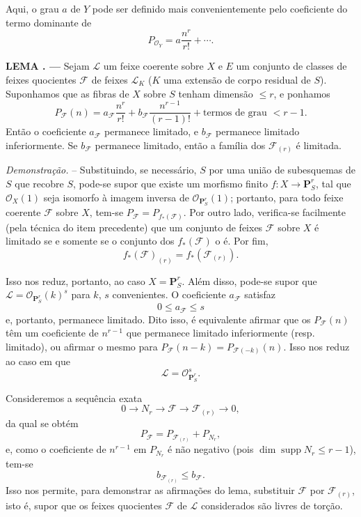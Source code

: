 \documentclass[11pt,twoside,openany]{book}
\numberwithin{equation}{section}
\newcommand{\src}[1]{%
  \phantomsection\hypertarget{src:#1}{}%
  \marginpar{\raggedleft\footnotesize\sffamily #1}%
}
\theoremstyle{plain}
\theoremstyle{definition}
\theoremstyle{remark}
\newcommand{\result}[2]{%
  \par\medskip\noindent\textbf{#1%
  \if\relax\detokenize{#2}\relax\else\space#2\fi. ---}\enspace
}
\newcommand{\FgaUnitKey}{frontmatter}
\renewcommand{\src}[1]{%
  \phantomsection\hypertarget{src:\FgaUnitKey:#1}{}%
  \marginpar{\raggedleft\footnotesize\sffamily #1}%
}
\begin{document}
Aqui, o grau $a$ de $Y$ pode ser definido mais convenientemente pelo
coeficiente do termo dominante de
\[
P_{\mathcal O_Y}=a\frac{n^r}{r!}+\cdots.
\]

\result{LEMA}{2.5} Sejam $\mathcal L$ um feixe coerente sobre $X$ e $E$ um
conjunto de classes de feixes quocientes $\mathcal F$ de feixes $\mathcal L_K$
($K$ uma extensão de corpo residual de $S$). Suponhamos que as fibras de $X$
sobre $S$ tenham dimensão $\leq r$, e ponhamos
\[
P_{\mathcal F}(n)=a_{\mathcal F}\frac{n^r}{r!}
+b_{\mathcal F}\frac{n^{r-1}}{(r-1)!}
+\text{termos de grau $<r-1$}.
\]
Então o coeficiente $a_{\mathcal F}$ permanece limitado, e $b_{\mathcal F}$
permanece limitado inferiormente. Se $b_{\mathcal F}$ permanece limitado,
então a família dos $\mathcal F_{(r)}$ é limitada.

\emph{Demonstração.} -- Substituindo, se necessário, $S$ por uma união de
subesquemas de $S$ que recobre $S$, pode-se supor que existe um morfismo finito
$f:X\longrightarrow\mathbf P^r_S$, tal que $\mathcal O_X(1)$ seja isomorfo à
imagem inversa de $\mathcal O_{\mathbf P^r_S}(1)$; portanto, para todo feixe
coerente $\mathcal F$ sobre $X$, tem-se
$P_{\mathcal F}=P_{f_*(\mathcal F)}$. Por outro lado, verifica-se facilmente
(pela técnica do item precedente) que um conjunto de feixes $\mathcal F$ sobre
$X$ é limitado se e somente se o conjunto dos $f_*(\mathcal F)$ o é. Por fim,
\[
f_*(\mathcal F)_{(r)}=f_*(\mathcal F_{(r)}).
\]
\src{256}
Isso nos reduz, portanto, ao caso $X=\mathbf P^r_S$. Além disso, pode-se supor
que $\mathcal L=\mathcal O_{\mathbf P^r_S}(k)^s$ para $k$, $s$ convenientes. O
coeficiente $a_{\mathcal F}$ satisfaz
\[
0\leq a_{\mathcal F}\leq s
\]
e, portanto, permanece limitado. Dito isso, é equivalente afirmar que os
$P_{\mathcal F}(n)$ têm um coeficiente de $n^{r-1}$ que permanece limitado
inferiormente (resp. limitado), ou afirmar o mesmo para
$P_{\mathcal F}(n-k)=P_{\mathcal F(-k)}(n)$. Isso nos reduz ao caso em que
\[
\mathcal L=\mathcal O_{\mathbf P^r_S}^{s}.
\]

Consideremos a sequência exata
\[
0\longrightarrow N_r\longrightarrow\mathcal F
\longrightarrow\mathcal F_{(r)}\longrightarrow0,
\]
da qual se obtém
\[
P_{\mathcal F}=P_{\mathcal F_{(r)}}+P_{N_r},
\]
e, como o coeficiente de $n^{r-1}$ em $P_{N_r}$ é não negativo (pois
$\dim\operatorname{supp}N_r\leq r-1$), tem-se
\[
b_{\mathcal F_{(r)}}\leq b_{\mathcal F}.
\]
Isso nos permite, para demonstrar as afirmações do lema, substituir
$\mathcal F$ por $\mathcal F_{(r)}$, isto é, supor que os feixes quocientes
$\mathcal F$ de $\mathcal L$ considerados são livres de torção.
\end{document}
